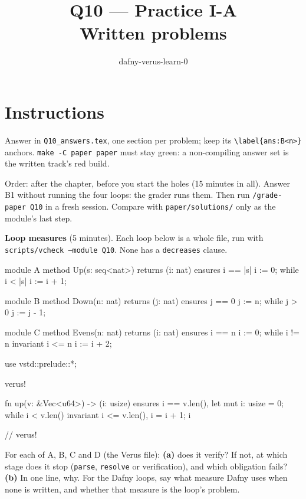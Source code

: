\documentclass[11pt]{article}
\title{Q10 --- Practice I-A \\ \large Written problems}
\author{dafny-verus-learn-0}
\date{}
\begin{document}
\maketitle

\section*{Instructions}
Answer in \texttt{Q10\_answers.tex}, one section per problem; keep its
\verb+\label{ans:B<n>}+ anchors. \texttt{make -C paper paper} must stay green:
a non-compiling answer set is the written track's red build.

Order: after the chapter, before you start the holes (15 minutes in all).
Answer B1 without running the four loops: the grader runs them. Then run
\texttt{/grade-paper Q10} in a fresh session. Compare with
\texttt{paper/solutions/} only as the module's last step.

\begin{problem}[concept]\label{prob:B1}
\textbf{Loop measures} (5 minutes). Each loop below is a whole file, run with
\texttt{scripts/vcheck --module Q10}. None has a \texttt{decreases} clause.
\begin{dafnycode}
module A {
  method Up(s: seq<nat>) returns (i: nat)
    ensures i == |s|
  {
    i := 0;
    while i < |s|
    {
      i := i + 1;
    }
  }
}
\end{dafnycode}
\begin{dafnycode}
module B {
  method Down(n: nat) returns (j: nat)
    ensures j == 0
  {
    j := n;
    while j > 0
    {
      j := j - 1;
    }
  }
}
\end{dafnycode}
\begin{dafnycode}
module C {
  method Evens(n: nat) returns (i: nat)
    ensures i == n
  {
    i := 0;
    while i != n
      invariant i <= n
    {
      i := i + 2;
    }
  }
}
\end{dafnycode}
\begin{veruscode}
use vstd::prelude::*;

verus! {

fn up(v: &Vec<u64>) -> (i: usize)
    ensures
        i == v.len(),
{
    let mut i: usize = 0;
    while i < v.len()
        invariant
            i <= v.len(),
    {
        i = i + 1;
    }
    i
}

} // verus!
\end{veruscode}
For each of A, B, C and D (the Verus file): \textbf{(a)} does it verify?
If not, at which stage does it stop (\texttt{parse}, \texttt{resolve} or
verification), and which obligation fails? \textbf{(b)} In one line, why. For
the Dafny loops, say what measure Dafny uses when none is written, and whether
that measure is the loop's problem.
\end{problem}
\end{document}
